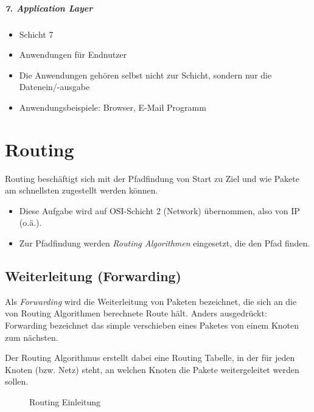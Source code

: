     \paragraph{7. Application Layer}
        \begin{itemize}
        	\item Schicht 7
        	\item Anwendungen für Endnutzer
        	\item Die Anwendungen gehören selbst nicht zur Schicht, sondern nur die Datenein/-ausgabe
        	\item Anwendungsbeispiele: Browser, E-Mail Programm
        \end{itemize}

\chapter{Routing}
    Routing beschäftigt sich mit der Pfadfindung von Start zu Ziel und wie Pakete am schnellsten zugestellt werden können.
    \begin{itemize}
    	\item Diese Aufgabe wird auf OSI-Schicht 2 (Network) übernommen, also von IP (o.ä.).
    	\item Zur Pfadfindung werden \textit{Routing Algorithmen} eingesetzt, die den Pfad finden.
    \end{itemize}

    \section{Weiterleitung (Forwarding)}
        Als \textit{Forwarding} wird die Weiterleitung von Paketen bezeichnet, die sich an die von Routing Algorithmen berechnete Route hält. Anders ausgedrückt: Forwarding bezeichnet das simple verschieben eines Paketes von einem Knoten zum nächsten.
        
        Der Routing Algorithmus erstellt dabei eine Routing Tabelle, in der für jeden Knoten (bzw. Netz) steht, an welchen Knoten die Pakete weitergeleitet werden sollen.
        
        \begin{figure}[H]
		    \centering
            \caption{Routing Einleitung}
        \end{figure}

